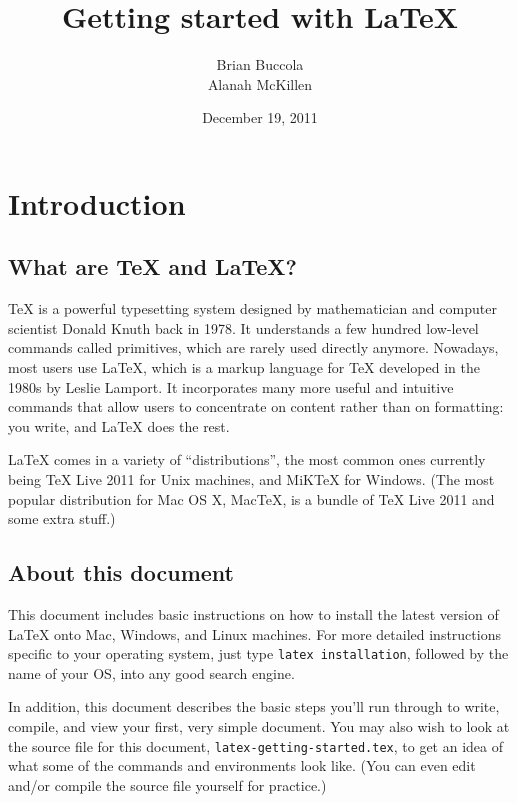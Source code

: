 \documentclass{article}
\title{Getting started with \LaTeX{}}       %
\author{Brian Buccola \\ Alanah McKillen}   %
\date{December 19, 2011}                    %
\begin{document}
\maketitle


\section{Introduction}


\subsection{What are \TeX{} and \LaTeX{}?}

\TeX{} is a powerful typesetting system designed by mathematician and computer
scientist Donald Knuth back in 1978. It understands a few hundred low-level
commands called primitives, which are rarely used directly anymore. Nowadays,
most users use \LaTeX{}, which is a markup language for \TeX{} developed in the
1980s by Leslie Lamport. It incorporates many more useful and intuitive commands
that allow users to concentrate on content rather than on formatting: you write,
and \LaTeX{} does the rest.

\LaTeX{} comes in a variety of ``distributions'', the most common ones currently
being \TeX{} Live 2011 for Unix machines, and MiK\TeX{} for Windows. (The most
popular distribution for Mac OS X, Mac\TeX, is a bundle of \TeX{} Live 2011 and
some extra stuff.)

\subsection{About this document}

This document includes basic instructions on how to install the latest version
of \LaTeX{} onto Mac, Windows, and Linux machines. For more detailed
instructions specific to your operating system, just type \texttt{latex
installation}, followed by the name of your OS, into any good search engine.

In addition, this document describes the basic steps you'll run through to
write, compile, and view your first, very simple document. You may also wish to
look at the source file for this document, \texttt{latex-getting-started.tex},
to get an idea of what some of the commands and environments look like. (You can
even edit and/or compile the source file yourself for practice.)
\end{document}
